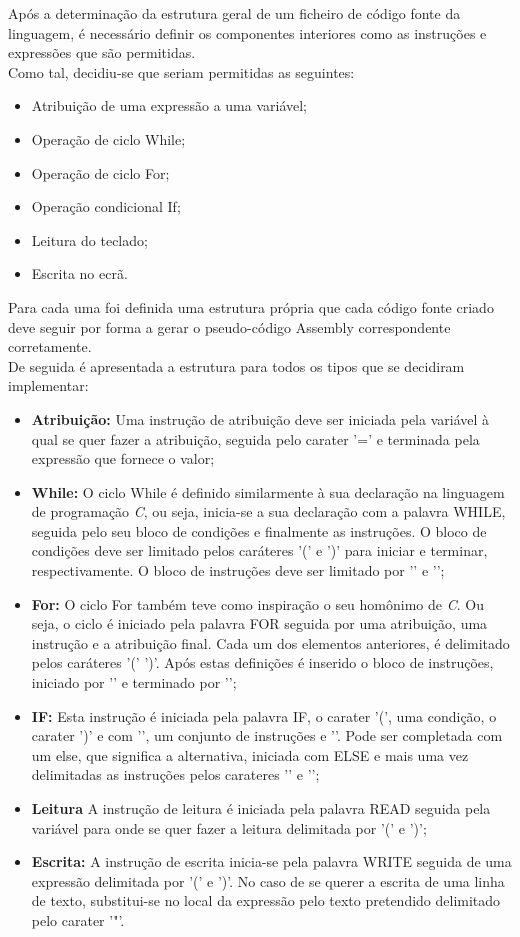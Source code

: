 \documentclass{report}
\begin{document}
Após a determinação da estrutura geral de um ficheiro de código fonte da linguagem, é necessário definir os componentes interiores como as instruções e expressões que são permitidas. \\ Como tal, decidiu-se que seriam permitidas as seguintes:
\begin{itemize}
	\item Atribuição de uma expressão a uma variável;
	\item Operação de ciclo While;
	\item Operação de ciclo For;
	\item Operação condicional If;
	\item Leitura do teclado;
	\item Escrita no ecrã.
\end{itemize}
Para cada uma foi definida uma estrutura própria que cada código fonte criado deve seguir por forma a gerar o pseudo-código Assembly correspondente corretamente. \\De seguida é apresentada a estrutura para todos os tipos que se decidiram implementar:
\begin{itemize}
	\item \textbf{Atribuição:} Uma instrução de atribuição deve ser iniciada pela variável à qual se quer fazer a atribuição, seguida pelo carater '=' e terminada pela expressão que fornece o valor;
	\item \textbf{While:} O ciclo While é definido similarmente à sua declaração na linguagem de programação \textit{C}, ou seja, inicia-se a sua declaração com a palavra WHILE, seguida pelo seu bloco de condições e finalmente as instruções. O bloco de condições deve ser limitado pelos caráteres '(' e ')' para iniciar e terminar, respectivamente. O bloco de instruções deve ser limitado por '{' e '}';
	\item \textbf{For:} O ciclo For também teve como inspiração o seu homônimo de \textit{C}. Ou seja, o ciclo é iniciado pela palavra FOR seguida por uma atribuição, uma instrução e a atribuição final. Cada um dos elementos anteriores, é delimitado pelos caráteres '(' ')'. Após estas definições é inserido o bloco de instruções, iniciado por '{' e terminado por '}';
	\item \textbf{IF:} Esta instrução é iniciada pela palavra IF, o carater '(', uma condição, o carater ')' e com '{', um conjunto de instruções e '}'. Pode ser completada com um else, que significa a alternativa, iniciada com ELSE e mais uma vez delimitadas as instruções pelos carateres '{' e '}';
	\item \textbf{Leitura} A instrução de leitura é iniciada pela palavra READ seguida pela variável para onde se quer fazer a leitura delimitada por '(' e ')';
	\item \textbf{Escrita:} A instrução de escrita inicia-se pela palavra WRITE seguida de uma expressão delimitada por '(' e ')'. No caso de se querer a escrita de uma linha de texto, substitui-se no local da expressão pelo texto pretendido delimitado pelo carater '"'.
\end{itemize}
\end{document}
